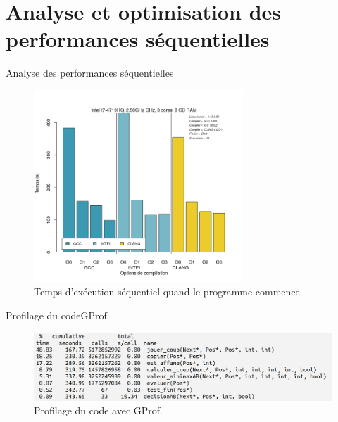 \documentclass{beamer}
\begin{document}
\section{Analyse et optimisation des performances séquentielles}

\begin{frame}{Analyse des performances séquentielles}

\begin{figure}
      \includegraphics[width=0.7\textwidth]{GCCvsICCvsCLANG_j2.png}
      \caption{Temps d’exécution séquentiel quand le programme commence.}
\end{figure}
\end{frame}

\begin{frame}{Profilage du code}{GProf}
\begin{figure}
        \includegraphics[width=\textwidth]{gprof.png}
        \caption{Profilage du code avec GProf.\label{Fig:GProf}}
\end{figure}
\end{frame}
\end{document}
